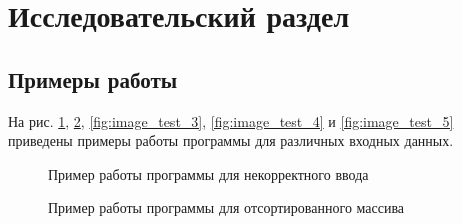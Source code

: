 \documentclass[a4paper,12pt]{article}
\begin{document}
\pagebreak

\section{Исследовательский раздел}

    
    \subsection{Примеры работы}
        
        На рис. \ref{fig:image_test_1}, \ref{fig:image_test_2}, \ref{fig:image_test_3}, \ref{fig:image_test_4} и \ref{fig:image_test_5} приведены примеры работы программы для различных входных данных. 
        
        	\begin{figure}[h!]
                \caption{Пример работы программы для некорректного ввода}
                \label{fig:image_test_1}
            \end{figure}
            
            
            \begin{figure}[h!]
                \caption{Пример работы программы для отсортированного массива }
                \label{fig:image_test_2}
            \end{figure}        
        
\end{document}
